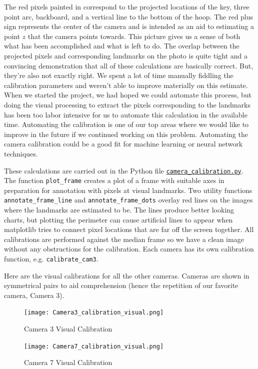 \documentclass{article}
\begin{document}
The red pixels painted in correspond to the projected locations of the key,
three point arc, backboard, and a vertical line to the bottom of the hoop.
The red plus sign represents the center of the camera and is intended as an aid
to estimating a point $z$ that the camera points towards.
This picture gives us a sense of both what has been accomplished and what is left to do.
The overlap between the projected pixels and corresponding landmarks on the photo is quite tight
and a convincing demonstration that all of these calculations are basically correct.
But, they're also not exactly right.  We spent a lot of time manually fiddling the calibration parameters
and weren't able to improve materially on this estimate.
When we started the project, we had hoped we could automate this process, but doing the visual
processing to extract the pixels corresponding to the landmarks has been too labor intensive for us
to automate this calculation in the available time.  
Automating the calibration is one of our top areas where we would like to improve in the future
if we continued working on this problem.  
Automating the camera calibration could be a good fit for machine learning or neural network techniques.

These calculations are carried out in the Python file 
\href{https://github.com/Harvard-AM-205-Basketball/Basketball/blob/master/src/camera_calibration.py}
{\texttt{camera\_calibration.py}}.
The function \texttt{plot\_frame} creates a plot of a frame with suitable axes in preparation 
for annotation with pixels at visual landmarks.
Two utility functions \texttt{annotate\_frame\_line} and \texttt{annotate\_frame\_dots}
overlay red lines on the images where the landmarks are estimated to be.
The lines produce better looking charts, but plotting the perimeter can cause artificial 
lines to appear when matplotlib tries to connect pixel locations that are far off the screen together.
All calibrations are performed against the median frame so we have a clean image without
any obstructions for the calibration.
Each camera has its own calibration function, e.g. \texttt{calibrate\_cam3}.

Here are the visual calibrations for all the other cameras.
Cameras are shown in symmetrical pairs to aid comprehension
(hence the repetition of our favorite camera, Camera 3).
\newpage
\begin{figure}[H]
\center
\texttt{[image: Camera3\_calibration\_visual.png]}
\caption*{Camera 3 Visual Calibration}
\texttt{[image: Camera7\_calibration\_visual.png]}
\caption*{Camera 7 Visual Calibration}
\end{figure}
\end{document}
